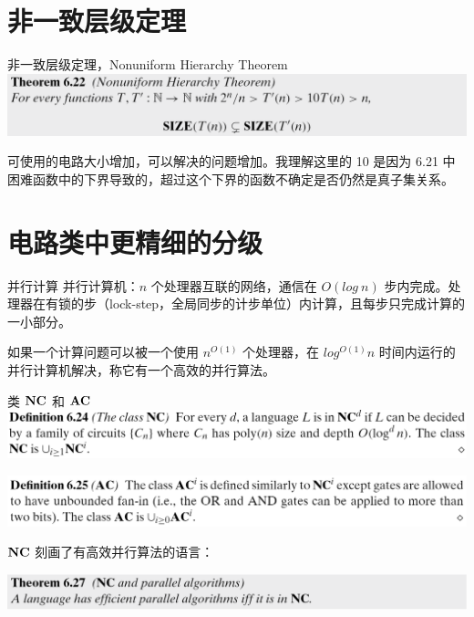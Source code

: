 \documentclass[UTF8,aspectratio=169,mathserif]{beamer}
\begin{document}
	\section{非一致层级定理}
	\begin{frame}{非一致层级定理，Nonuniform Hierarchy Theorem}
		\includegraphics[width=\linewidth]{../../5 & 6/note.assets/image-20210427161541129.png}\newline
		
		可使用的电路大小增加，可以解决的问题增加。我理解这里的 10 是因为 6.21 中困难函数中的下界导致的，超过这个下界的函数不确定是否仍然是真子集关系。
	\end{frame}
	
	\section{电路类中更精细的分级}
	\begin{frame}{并行计算}
		并行计算机：$n$ 个处理器互联的网络，通信在 $O(log\ n)$ 步内完成。处理器在有锁的步（lock-step，全局同步的计步单位）内计算，且每步只完成计算的一小部分。\newline
		
		如果一个计算问题可以被一个使用 $n^{O(1)}$ 个处理器，在 $log^{O(1)}n$ 时间内运行的并行计算机解决，称它有一个高效的并行算法。
	\end{frame}

	\begin{frame}{类 $\bf NC$ 和 $\bf AC$}
		\includegraphics[width=\linewidth]{../../5 & 6/note.assets/image-20210427162533386.png}\newline
		
		\includegraphics[width=\linewidth]{../../5 & 6/note.assets/image-20210427162543119.png}\newline
		
		$\bf NC$ 刻画了有高效并行算法的语言：
		
		\includegraphics[width=\linewidth]{../../5 & 6/note.assets/image-20210427162618074.png}
	\end{frame}
\end{document}
